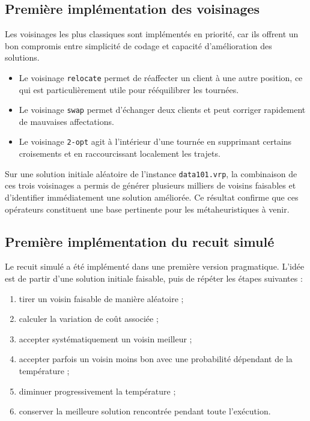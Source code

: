 \documentclass[11pt,a4paper]{article}
\begin{document}
\subsection{Première implémentation des voisinages}
Les voisinages les plus classiques sont implémentés en priorité, car ils offrent un bon compromis entre simplicité de codage et capacité d'amélioration des solutions.

\begin{itemize}
    \item Le voisinage \texttt{relocate} permet de réaffecter un client à une autre position, ce qui est particulièrement utile pour rééquilibrer les tournées.
    \item Le voisinage \texttt{swap} permet d'échanger deux clients et peut corriger rapidement de mauvaises affectations.
    \item Le voisinage \texttt{2-opt} agit à l'intérieur d'une tournée en supprimant certains croisements et en raccourcissant localement les trajets.
\end{itemize}

Sur une solution initiale aléatoire de l'instance \texttt{data101.vrp}, la combinaison de ces trois voisinages a permis de générer plusieurs milliers de voisins faisables et d'identifier immédiatement une solution améliorée. Ce résultat confirme que ces opérateurs constituent une base pertinente pour les métaheuristiques à venir.

\subsection{Première implémentation du recuit simulé}
Le recuit simulé a été implémenté dans une première version pragmatique. L'idée est de partir d'une solution initiale faisable, puis de répéter les étapes suivantes :
\begin{enumerate}[label=\arabic*.]
    \item tirer un voisin faisable de manière aléatoire ;
    \item calculer la variation de coût associée ;
    \item accepter systématiquement un voisin meilleur ;
    \item accepter parfois un voisin moins bon avec une probabilité dépendant de la température ;
    \item diminuer progressivement la température ;
    \item conserver la meilleure solution rencontrée pendant toute l'exécution.
\end{enumerate}
\end{document}
